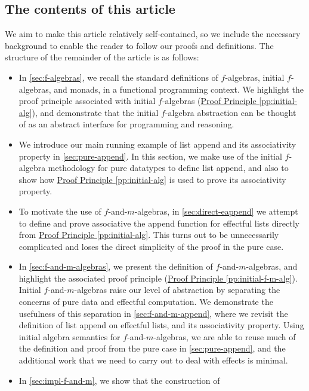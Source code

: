 \documentclass{jfp1}
\newcommand{\proofprinref}[1]{\hyperref[#1]{Proof Principle \ref*{#1}}}
\begin{document}
\subsection{The contents of this article}

We aim to make this article relatively self-contained, so we include the
necessary background to enable the reader to follow our proofs and
definitions. The structure of the remainder of the article is as
follows:
\begin{itemize}
\item In \autoref{sec:f-algebras}, we recall the standard definitions
  of $f$-algebras, initial $f$-algebras, and monads, in a functional
  programming context. We highlight the proof principle associated
  with initial $f$-algebras (\proofprinref{pp:initial-alg}), and
  demonstrate that the initial $f$-algebra abstraction can be thought
  of as an abstract interface for programming and reasoning.
\item We introduce our main running example of list append and its
  associativity property in \autoref{sec:pure-append}. In this
  section, we make use of the initial $f$-algebra methodology for pure
  datatypes to define list append, and also to show how
  \proofprinref{pp:initial-alg} is used to prove its associativity
  property.
\item To motivate the use of $f$-and-$m$-algebras, in
  \autoref{sec:direct-eappend} we attempt to define and prove
  associative the append function for effectful lists directly from
  \proofprinref{pp:initial-alg}. This turns out to be unnecessarily
  complicated and loses the direct simplicity of the proof in the pure
  case.
\item In \autoref{sec:f-and-m-algebras}, we present the definition of
  $f$-and-$m$-algebras, and highlight the associated proof principle
  (\proofprinref{pp:initial-f-m-alg}). Initial $f$-and-$m$-algebras
  raise our level of abstraction by separating the concerns of pure
  data and effectful computation. We demonstrate the usefulness of
  this separation in \autoref{sec:f-and-m-append}, where we revisit
  the definition of list append on effectful lists, and its
  associativity property. Using initial algebra semantics for
  $f$-and-$m$-algebras, we are able to reuse much of the
  definition and proof from the pure case in
  \autoref{sec:pure-append}, and the additional work that we need to
  carry out to deal with effects is minimal.
\item In \autoref{sec:impl-f-and-m}, we show that the construction of

\end{itemize}
\end{document}
